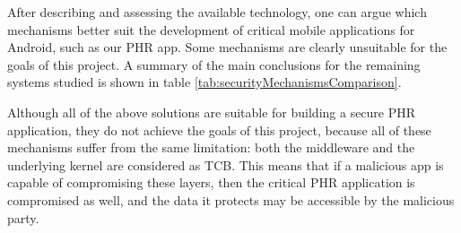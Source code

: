 





After describing and assessing the available technology, one can argue which mechanisms better suit the development of critical mobile applications for Android, such as our \ac{PHR} app. Some mechanisms are clearly unsuitable for the goals of this project. %
A summary of the main conclusions for the remaining systems studied is shown in table \ref{tab:securityMechanismsComparison}.

Although all of the above solutions are suitable for building a secure \ac{PHR} application, they do not achieve the goals of this project, because all of these mechanisms suffer from the same limitation: both the middleware and the underlying kernel are considered as \ac{TCB}. This means that if a malicious app is capable of compromising these layers, then the critical \ac{PHR} application is compromised as well, and the data it protects may be accessible by the malicious party. 

